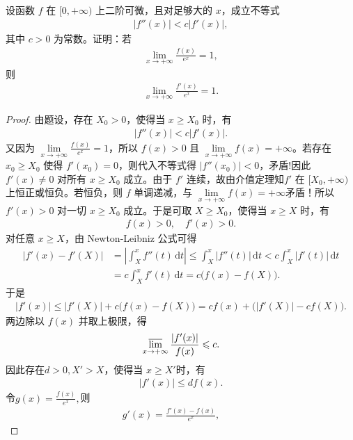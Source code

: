 \documentclass[../../main.tex]{subfiles}%
\begin{document}
\begin{example}
设函数 $f$ 在 $[0,+\infty)$ 上二阶可微，且对足够大的 $x$，成立不等式
\begin{align*}
|f''(x)| < c|f'(x)|,
\end{align*}
其中 $c>0$ 为常数。证明：若
\begin{align*}
\lim\limits_{x\to+\infty}\frac{f(x)}{e^x}=1,
\end{align*}
则
\begin{align*}
\lim\limits_{x\to+\infty}\frac{f'(x)}{e^x}=1.
\end{align*}
\end{example}
\begin{proof}
由题设，存在 $X_0>0$，使得当 $x\geqslant X_0$ 时，有
\begin{align*}
|f''(x)| < c|f'(x)|.
\end{align*}
又因为 $\lim\limits_{x\to+\infty}\frac{f(x)}{e^x}=1$，所以 $f(x)>0$ 且 $\lim\limits_{x\to+\infty}f(x)=+\infty$。若存在 $x_0\geqslant X_0$ 使得 $f'(x_0)=0$，则代入不等式得 $|f''(x_0)|<0$，矛盾!因此 $f'(x)\neq 0$ 对所有 $x\geqslant X_0$ 成立。由于 $f'$ 连续，故由介值定理知$f'$ 在 $[X_0,+\infty)$ 上恒正或恒负。若恒负，则 $f$ 单调递减，与 $\lim\limits_{x\to+\infty}f(x)=+\infty$矛盾！所以 $f'(x)>0$ 对一切 $x\geqslant X_0$ 成立。于是可取 $X\geqslant X_0$，使得当 $x\geqslant X$ 时，有
\begin{align*}
f(x)>0,\quad f'(x)>0.
\end{align*}
对任意 $x\geqslant X$，由 Newton-Leibniz 公式可得
\begin{align*}
|f'(x)-f'(X)| &=\left|\int_{X}^{x} f''(t)\,\mathrm{d}t\right| \leqslant \int_{X}^{x} |f''(t)|\,\mathrm{d}t < c\int_{X}^{x} |f'(t)|\,\mathrm{d}t \\
&= c\int_{X}^{x} f'(t)\,\mathrm{d}t = c\bigl(f(x)-f(X)\bigr).
\end{align*}
于是
\begin{align*}
|f'(x)| \leqslant |f'(X)| + c\bigl(f(x)-f(X)\bigr) = c f(x) + \bigl(|f'(X)| - c f(X)\bigr).
\end{align*}
两边除以 $f(x)$ 并取上极限，得
\begin{align*}
\varlimsup_{x\to+\infty}\frac{|f'(x)|}{f(x)} \leqslant c.
\end{align*}
因此存在$d>0,X'>X$，使得当 $x\geqslant X'$时，有
\begin{align}\label{eq::jiofjiwwjifj--12}
|f'(x)| \leqslant d f(x).
\end{align}
令$g(x)=\frac{f(x)}{e^x},$则
\begin{align*}
g'(x)=\frac{f'(x)-f(x)}{e^x},\qquad

\end{align*}
\end{proof}
\end{document}
